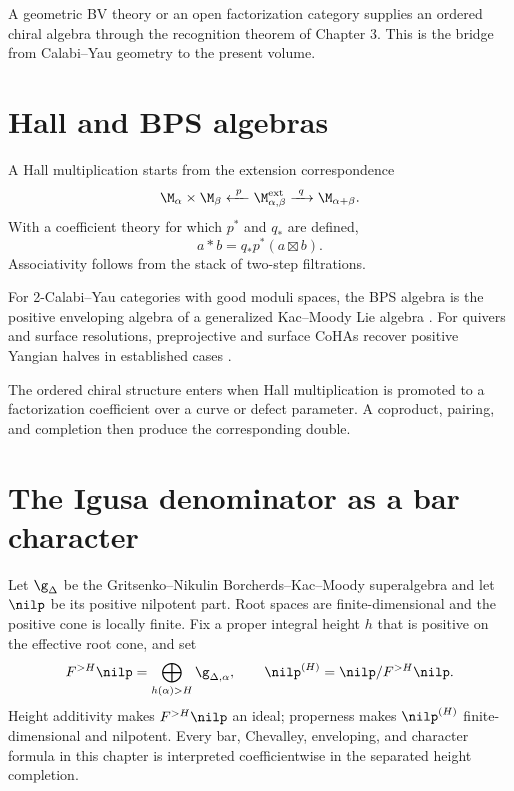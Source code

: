 A geometric BV theory or an open factorization category supplies an ordered chiral algebra through the recognition theorem of Chapter 3. This is the bridge from Calabi--Yau geometry to the present volume.

\chapter{Hall and BPS algebras}
A Hall multiplication starts from the extension correspondence
\[
 \M_{\alpha}\times\M_{\beta}
 \xleftarrow{\ p\ }\M_{\alpha,\beta}^{\mathrm{ext}}
 \xrightarrow{\ q\ }\M_{\alpha+\beta}.
\]
With a coefficient theory for which $p^*$ and $q_*$ are defined,
\[
 a*b=q_*p^*(a\boxtimes b).
\]
Associativity follows from the stack of two-step filtrations.

For 2-Calabi--Yau categories with good moduli spaces, the BPS algebra is the positive enveloping algebra of a generalized Kac--Moody Lie algebra \cite{DHS}. For quivers and surface resolutions, preprojective and surface CoHAs recover positive Yangian halves in established cases \cite{SVYangians,DPPSSV}.

The ordered chiral structure enters when Hall multiplication is promoted to a factorization coefficient over a curve or defect parameter. A coproduct, pairing, and completion then produce the corresponding double.

\chapter{The Igusa denominator as a bar character}
Let $\g_\Delta$ be the Gritsenko--Nikulin Borcherds--Kac--Moody superalgebra and let $\nilp$ be its positive nilpotent part. Root spaces are finite-dimensional and the positive cone is locally finite. Fix a proper integral height $h$ that is positive on the effective root cone, and set
\[
 F^{>H}\nilp=\bigoplus_{h(\alpha)>H}\g_{\Delta,\alpha},
 \qquad
 \nilp^{(H)}=\nilp/F^{>H}\nilp.
\]
Height additivity makes $F^{>H}\nilp$ an ideal; properness makes $\nilp^{(H)}$ finite-dimensional and nilpotent. Every bar, Chevalley, enveloping, and character formula in this chapter is interpreted coefficientwise in the separated height completion.


